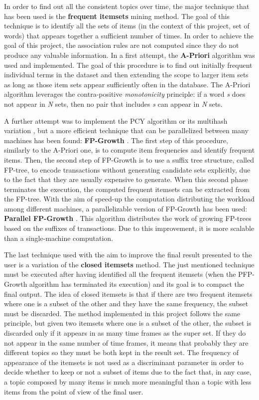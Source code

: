In order to find out all the consistent topics over time, the major technique that has been used is the \textbf{frequent itemsets} mining method. The goal of this technique is to identify all the sets of items (in the context of this project, set of words) that appears together a sufficient number of times. In order to achieve the goal of this project, the association rules are not computed since they do not produce any valuable information. In a first attempt, the \textbf{A-Priori} algorithm \cite{apriori-algorithm} was used and implemented. The goal of this procedure is to find out initially frequent individual terms in the dataset and then extending the scope to larger item sets as long as those item sets appear sufficiently often in the database. The A-Priori algorithm leverages the contra-positive \textit{monotonicity} principle: if a word \textit{s} does not appear in \textit{N} sets, then no pair that includes \textit{s} can appear in \textit{N} sets.

\noindent A further attempt was to implement the PCY algorithm or its multihash variation \cite{pcy-multihash-algorithms}, but a more efficient technique that can be parallelized between many machines has been found: \textbf{FP-Growth} \cite{fpgrowth-paper}. The first step of this procedure, similarly to the A-Priori one, is to compute item frequencies and identify frequent items. Then, the second step of FP-Growth is to use a suffix tree structure, called FP-tree, to encode transactions without generating candidate sets explicitly, due to the fact that they are usually expensive to generate. When this second phase terminates the execution, the computed frequent itemsets can be extracted from the FP-tree. With the aim of speed-up the computation distributing the workload among different machines, a parallelizable version of FP-Growth has been used: \textbf{Parallel FP-Growth} \cite{pfpgrowth-paper}. This algorithm distributes the work of growing FP-trees based on the suffixes of transactions. Due to this improvement, it is more scalable than a single-machine computation.

\noindent The last technique used with the aim to improve the final result presented to the user is a variation of the \textbf{closed itemsets} method. The just mentioned technique must be executed after having identified all the frequent itemsets (when the PFP-Growth algorithm has terminated its execution) and its goal is to compact the final output. The idea of closed itemsets is that if there are two frequent itemsets where one is a subset of the other and they have the same frequency, the subset must be discarded. The method implemented in this project follows the same principle, but given two itemsets where one is a subset of the other, the subset is discarded only if it appears in as many time frames as the super set. If they do not appear in the same number of time frames, it means that probably they are different topics so they must be both kept in the result set. The frequency of appearance of the itemsets is not used as a discriminant parameter in order to decide whether to keep or not a subset of items due to the fact that, in any case, a topic composed by many items is much more meaningful than a topic with less items from the point of view of the final user.

